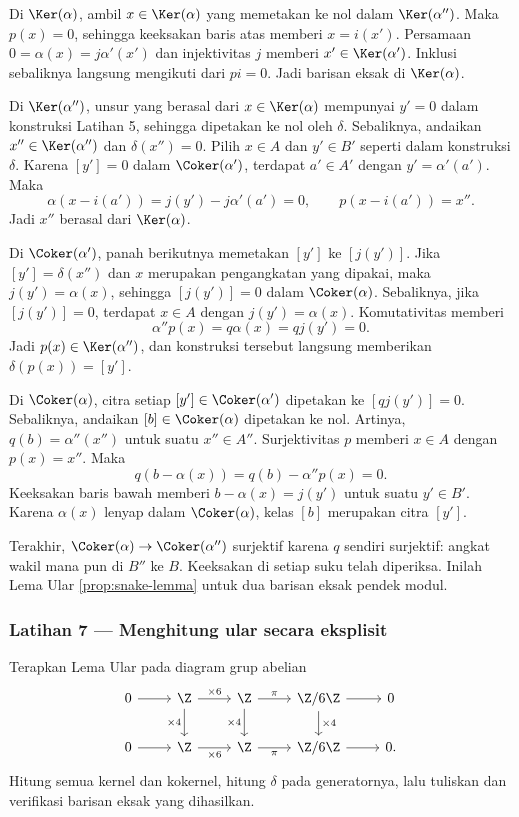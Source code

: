 Di $\Ker(\alpha)$, ambil $x\in\Ker(\alpha)$ yang memetakan ke nol dalam
$\Ker(\alpha'')$. Maka $p(x)=0$, sehingga keeksakan baris atas memberi
$x=i(x')$. Persamaan
$0=\alpha(x)=j\alpha'(x')$ dan injektivitas $j$ memberi
$x'\in\Ker(\alpha')$. Inklusi sebaliknya langsung mengikuti dari $pi=0$.
Jadi barisan eksak
di $\Ker(\alpha)$.

Di $\Ker(\alpha'')$, unsur yang berasal dari $x\in\Ker(\alpha)$ mempunyai
$y'=0$ dalam konstruksi Latihan 5, sehingga dipetakan ke nol oleh $\delta$.
Sebaliknya, andaikan $x''\in\Ker(\alpha'')$ dan $\delta(x'')=0$. Pilih
$x\in A$ dan $y'\in B'$ seperti dalam konstruksi $\delta$. Karena
$[y']=0$ dalam $\Coker(\alpha')$, terdapat $a'\in A'$ dengan
$y'=\alpha'(a')$. Maka
\[
	\alpha(x-i(a'))=j(y')-j\alpha'(a')=0,
	\qquad p(x-i(a'))=x''.
\]
Jadi $x''$ berasal dari $\Ker(\alpha)$.

Di $\Coker(\alpha')$, panah berikutnya memetakan $[y']$ ke $[j(y')]$.
Jika $[y']=\delta(x'')$ dan $x$ merupakan pengangkatan yang dipakai, maka
$j(y')=\alpha(x)$, sehingga $[j(y')]=0$ dalam $\Coker(\alpha)$. Sebaliknya,
jika $[j(y')]=0$, terdapat $x\in A$ dengan $j(y')=\alpha(x)$. Komutativitas
memberi
\[
	\alpha''p(x)=q\alpha(x)=qj(y')=0.
\]
Jadi $p(x)\in\Ker(\alpha'')$, dan konstruksi tersebut langsung memberikan
$\delta(p(x))=[y']$.

Di $\Coker(\alpha)$, citra setiap $[y']\in\Coker(\alpha')$ dipetakan ke
$[qj(y')]=0$. Sebaliknya, andaikan $[b]\in\Coker(\alpha)$ dipetakan ke nol.
Artinya, $q(b)=\alpha''(x'')$ untuk suatu $x''\in A''$. Surjektivitas $p$
memberi $x\in A$ dengan $p(x)=x''$. Maka
\[
	q(b-\alpha(x))=q(b)-\alpha''p(x)=0.
\]
Keeksakan baris bawah memberi $b-\alpha(x)=j(y')$ untuk suatu $y'\in B'$.
Karena $\alpha(x)$ lenyap dalam $\Coker(\alpha)$, kelas $[b]$ merupakan
citra $[y']$.

Terakhir, $\Coker(\alpha)\to\Coker(\alpha'')$ surjektif karena $q$ sendiri
surjektif: angkat wakil mana pun di $B''$ ke $B$. Keeksakan di setiap suku
telah diperiksa. Inilah Lema Ular
\ref{prop:snake-lemma} untuk dua barisan eksak pendek modul.

\subsubsection*{Latihan 7 --- Menghitung ular secara eksplisit}
\hypertarget{o014.mastery.diagram-chasing.001.ex07}{ }
\label{mastery:diagram-chasing-001-ex07}

Terapkan Lema Ular pada diagram grup abelian
\[
\begin{tikzcd}
	0 \arrow[r] & \Z \arrow[r, "\times 6"] \arrow[d, "\times 4"'] & \Z \arrow[r, "\pi"] \arrow[d, "\times 4"'] & \Z/6\Z \arrow[r] \arrow[d, "\times 4"] & 0 \\
	0 \arrow[r] & \Z \arrow[r, "\times 6"'] & \Z \arrow[r, "\pi"'] & \Z/6\Z \arrow[r] & 0.
\end{tikzcd}
\]
Hitung semua kernel dan kokernel, hitung $\delta$ pada generatornya, lalu
tuliskan dan verifikasi barisan eksak yang dihasilkan.

